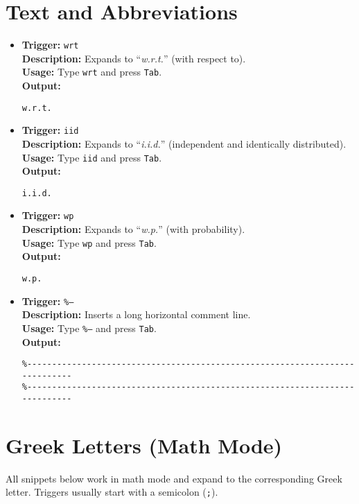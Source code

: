\documentclass{article}
\begin{document}
\section{Text and Abbreviations}
\begin{itemize}[leftmargin=*, label={}]
\item \textbf{Trigger:} \texttt{wrt} \\
\textbf{Description:} Expands to “\emph{w.r.t.}” (with respect to). \\
\textbf{Usage:} Type \texttt{wrt} and press \texttt{Tab}. \\
\textbf{Output:}
\begin{verbatim}
w.r.t.
\end{verbatim}

\item \textbf{Trigger:} \texttt{iid} \\
\textbf{Description:} Expands to “\emph{i.i.d.}” (independent and identically distributed). \\
\textbf{Usage:} Type \texttt{iid} and press \texttt{Tab}. \\
\textbf{Output:}
\begin{verbatim}
i.i.d.
\end{verbatim}

\item \textbf{Trigger:} \texttt{wp} \\
\textbf{Description:} Expands to “\emph{w.p.}” (with probability). \\
\textbf{Usage:} Type \texttt{wp} and press \texttt{Tab}. \\
\textbf{Output:}
\begin{verbatim}
w.p.
\end{verbatim}

\item \textbf{Trigger:} \texttt{\%--} \\
\textbf{Description:} Inserts a long horizontal comment line. \\
\textbf{Usage:} Type \texttt{\%--} and press \texttt{Tab}. \\
\textbf{Output:}
\begin{verbatim}
%----------------------------------------------------------------------------
%----------------------------------------------------------------------------
\end{verbatim}
\end{itemize}

\section{Greek Letters (Math Mode)}
All snippets below work in math mode and expand to the corresponding Greek letter. Triggers usually start with a semicolon (\texttt{;}).
\end{document}

